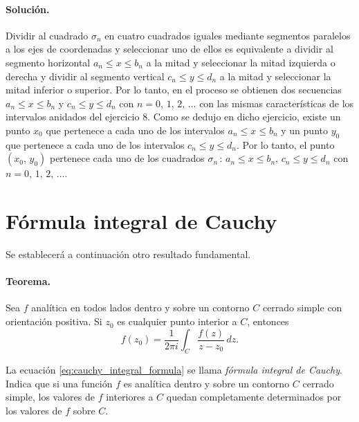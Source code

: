 \documentclass[a4paper]{report}
\begin{document}
\paragraph{Solución.} Dividir al cuadrado \(\sigma_n\) en cuatro cuadrados iguales mediante segmentos paralelos a los ejes de coordenadas y seleccionar uno de ellos es equivalente a dividir al segmento horizontal \(a_n\leq x\leq b_n\) a la mitad y seleccionar la mitad izquierda o derecha y dividir al segmento vertical \(c_n\leq y\leq d_n\) a la mitad y seleccionar la mitad inferior o superior. Por lo tanto, en el proceso se obtienen dos secuencias \(a_n\leq x\leq b_n\) y \(c_n\leq y\leq d_n\) con \(n=0,\,1,\,2,\,\dots\) con las mismas características de los intervalos anidados del ejercicio 8. Como se dedujo en dicho ejercicio, existe un punto \(x_0\) que pertenece a cada uno de los intervalos \(a_n\leq x\leq b_n\) y un punto \(y_0\) que pertenece a cada uno de los intervalos \(c_n\leq y\leq d_n\). Por lo tanto, el punto \((x_0,\,y_0)\) pertenece cada uno de los cuadrados \(\sigma_n\,:\,a_n\leq x\leq b_n,\,c_n\leq y\leq d_n\) con \(n=0,\,1,\,2,\,\dots\).

\section{Fórmula integral de Cauchy}\label{sec:cauchy_integral_formula}

Se establecerá a continuación otro resultado fundamental.

\paragraph{Teorema.} Sea \(f\) analítica en todos lados dentro y sobre un contorno \(C\) cerrado simple con orientación positiva. Si \(z_0\) es cualquier punto interior a \(C\), entonces
\begin{equation}\label{eq:cauchy_integral_formula}
 f(z_0)=\frac{1}{2\pi i}\int_C\frac{f(z)}{z-z_0}\,dz. 
\end{equation}

La ecuación \ref{eq:cauchy_integral_formula} se llama \emph{fórmula integral de Cauchy}. Indica que si una función \(f\) es analítica dentro y sobre un contorno \(C\) cerrado simple, los valores de \(f\) interiores a \(C\) quedan completamente determinados por los valores de \(f\) sobre \(C\).
\end{document}
